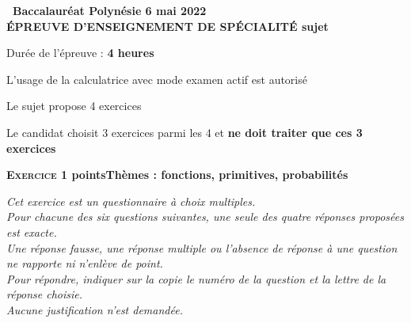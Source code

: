 \documentclass[11pt]{article}
\begin{document}
\setlength\parindent{0mm}
\pagestyle{fancy}
\thispagestyle{empty}

\begin{center}{\Large\textbf{\decofourleft~Baccalauréat Polynésie 6 mai 2022~\decofourright\\[6pt] ÉPREUVE D'ENSEIGNEMENT DE SPÉCIALITÉ sujet }}

\bigskip

Durée de l'épreuve : \textbf{4 heures}

\medskip

L'usage de la calculatrice avec mode examen actif est autorisé

\medskip

Le sujet propose 4 exercices

Le candidat choisit 3 exercices parmi les 4 et \textbf{ne doit traiter que ces 3 exercices}
\end{center}

\bigskip

\textbf{\textsc{Exercice 1}  points\hfill Thèmes : fonctions, primitives, probabilités}

\medskip

\emph{Cet exercice est un questionnaire à choix multiples. \\
Pour chacune des six questions suivantes, une seule des quatre réponses proposées est exacte.\\
Une réponse fausse, une réponse multiple ou l'absence de réponse à une question ne rapporte ni n'enlève de point.\\
Pour répondre, indiquer sur la copie le numéro de la question et la lettre de la réponse choisie.\\
Aucune justification n'est demandée.}

\medskip
\end{document}
